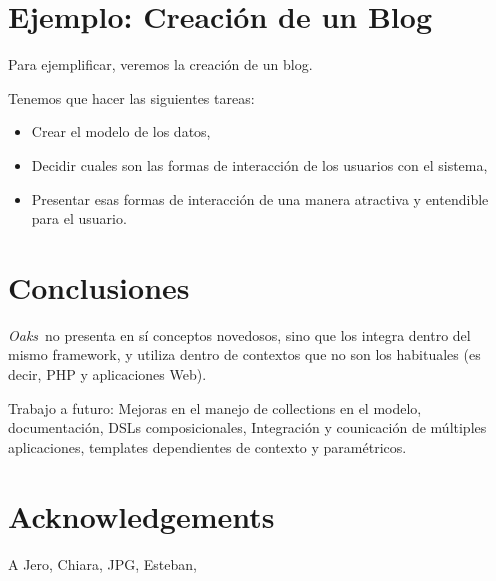 \documentclass[a4paper,10pt]{article}
\newcommand{\PWB}{\emph{Oaks}}
\begin{document}
\section{Ejemplo: Creación de un Blog}
Para ejemplificar, veremos la creación de un blog.

Tenemos que hacer las siguientes tareas:
\begin{itemize}
\item Crear el modelo de los datos,
\item Decidir cuales son las formas de interacción de los usuarios con el sistema,
\item Presentar esas formas de interacción de una manera atractiva y entendible para el usuario.
\end{itemize}





\section{Conclusiones}

\PWB \ no presenta en sí conceptos novedosos, sino que los integra dentro del mismo framework, y utiliza dentro de contextos que no son los habituales (es decir, PHP y aplicaciones Web).

Trabajo a futuro: Mejoras en el manejo de collections en el modelo, documentación, DSLs composicionales, Integración y counicación de múltiples aplicaciones, templates dependientes de contexto y paramétricos.

\section{Acknowledgements}

A Jero, Chiara, JPG, Esteban,


\end{document}
